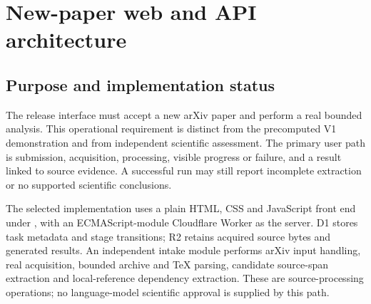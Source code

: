 \section{New-paper web and API architecture}\label{sec:web}

\subsection{Purpose and implementation status}

The release interface must accept a new arXiv paper and perform a real bounded analysis. This operational requirement is distinct from the precomputed V1 demonstration and from independent scientific assessment. The primary user path is submission, acquisition, processing, visible progress or failure, and a result linked to source evidence. A successful run may still report incomplete extraction or no supported scientific conclusions.


The selected implementation uses a plain HTML, CSS and JavaScript front end under , with an ECMAScript-module Cloudflare Worker as the server. D1 stores task metadata and stage transitions; R2 retains acquired source bytes and generated results. An independent intake module performs arXiv input handling, real acquisition, bounded archive and TeX parsing, candidate source-span extraction and local-reference dependency extraction. These are source-processing operations; no language-model scientific approval is supplied by this path.

